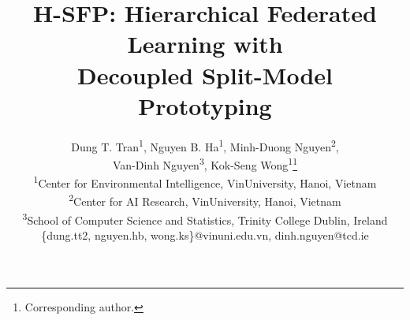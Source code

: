 \documentclass{article}
\title{H-SFP: Hierarchical Federated Learning with \\ Decoupled Split-Model Prototyping}
\author{\normalfont
    Dung T. Tran\textsuperscript{\rm 1},
    Nguyen B. Ha\textsuperscript{\rm 1},
    Minh-Duong Nguyen\textsuperscript{\rm 2},\\
    Van-Dinh Nguyen\textsuperscript{\rm 3},
    Kok-Seng Wong\textsuperscript{\rm 1}\thanks{Corresponding author.} \\
    \textsuperscript{\rm 1}Center for Environmental Intelligence, VinUniversity, Hanoi, Vietnam \\
    \textsuperscript{\rm 2}Center for AI Research, VinUniversity, Hanoi, Vietnam  \\
   \textsuperscript{\rm 3}School of Computer Science and Statistics, Trinity College Dublin,  Ireland\\
    \{dung.tt2, nguyen.hb, wong.ks\}@vinuni.edu.vn, dinh.nguyen@tcd.ie
}
\begin{document}
\maketitle

    







{
    \small
    
    
}

\newpage
\appendix




\end{document}
